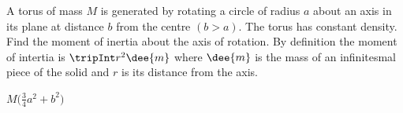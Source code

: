 \begin{question}
A torus of mass $M$ is generated by rotating a circle of radius $a$ about an axis in its plane at distance $b$ from the centre $(b>a)$. The
torus has constant density.
Find the moment of inertia about the axis of rotation.
By definition the moment of intertia is $\tripInt r^2 \dee{m}$ 
where $\dee{m}$ is the mass of an infinitesmal piece of the solid and $r$ is 
its distance from the axis.
\end{question}

%

\begin{answer}
$M\big(\frac{3}{4}a^2+b^2\big)$
\end{answer}

